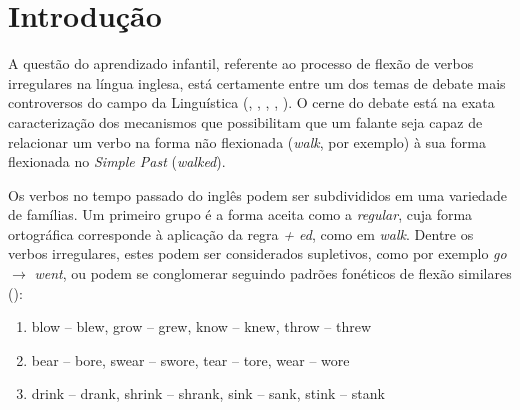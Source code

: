 \chapter{Introdução}
\label{ch:01}

A questão do aprendizado infantil, referente ao processo de flexão de verbos irregulares na língua inglesa, está certamente entre um dos temas de debate mais controversos %
do campo da Linguística (\cite{chomsky:1968}, \cite{Pinker:1999}, \cite{Pinker:1988}, \cite{Albright2003RulesVA}, \cite{kirov:2018}). O cerne do debate está na exata caracterização dos mecanismos que possibilitam que um falante seja capaz de relacionar um verbo na forma não flexionada (\textit{walk}, por exemplo) à sua forma flexionada no \textit{Simple Past} (\textit{walked}).

Os verbos no tempo passado do inglês podem ser subdivididos em uma variedade de famílias. Um primeiro grupo é a forma aceita como a \textit{regular}, cuja forma ortográfica corresponde à aplicação da regra \textit{ + ed}, como em \textit{walk}. %
Dentre os verbos irregulares, estes podem ser considerados supletivos, como por exemplo \textit{go} $\rightarrow$ \textit{went}, ou podem se conglomerar seguindo padrões fonéticos de flexão similares (\cite{Nelson:2010}):

\begin{enumerate}
    \item blow – blew, grow – grew, know – knew, throw – threw
    \item bear – bore, swear – swore, tear – tore, wear – wore
    \item drink – drank, shrink – shrank, sink – sank, stink – stank 
\end{enumerate}

